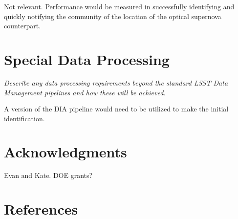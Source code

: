 \documentclass[12pt, letterpaper]{article}
\begin{document}
Not relevant.  Performance would be measured in successfully
identifying and quickly notifying the community of the location of the
optical supernova counterpart.


\vspace{.6in}

\section{Special Data Processing}
\begin{footnotesize}
{\it Describe any data processing requirements beyond the standard LSST Data Management pipelines and how these will be achieved.}
\end{footnotesize}

A version of the DIA pipeline would need to be utilized to make the
initial identification.

\section{Acknowledgments}

Evan and Kate. DOE grants?

\section{References}

 

\end{document}
